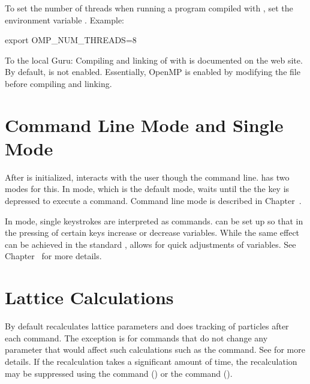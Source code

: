 To set the number of threads when running a program compiled with , set the environment variable
. Example:
\begin{example}
  export OMP_NUM_THREADS=8
\end{example}

To the local \bmad Guru: Compiling and linking of \tao with  is documented on the \bmad
web site. By default,  is not enabled. Essentially, OpenMP is enabled by modifying
the  file before compiling and linking.

\section{Command Line Mode and Single Mode}
\label{s:modes}

After \tao is initialized, \tao interacts with the user though the command line. \tao has two modes
for this. In  mode, which is the default mode, \tao waits until the the 
key is depressed to execute a command. Command line mode is described in Chapter~. 

In  mode, single keystrokes are interpreted as commands. \tao can be set up so that in
 the pressing of certain keys increase or decrease variables. While the same effect
can be achieved in the standard ,  allows for quick adjustments of
variables. See Chapter~ for more details.

\section{Lattice Calculations}
\label{s:lat.calc.overview} 

By default \tao recalculates lattice parameters and does tracking of particles after each command.
The exception is for commands that do not change any parameter that would affect such calculations
such as the  command. See  for more details. If the recalculation takes a
significant amount of time, the recalculation may be suppressed using the  command () or the  command
().

